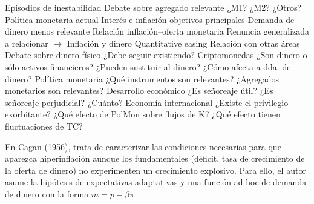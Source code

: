 \documentclass{nuevotema}
\begin{document}
\begin{esquemal}
				\4 Episodios de inestabilidad
				\4 Debate sobre agregado relevante
				\4[] ¿M1? ¿M2? ¿Otros?
			\3 Política monetaria actual
				\4 Interés e inflación objetivos principales
				\4 Demanda de dinero menos relevante
				\4 Relación inflación--oferta monetaria
				\4[] Renuncia generalizada a relacionar
				\4[] $\to$ Inflación y dinero
				\4[] Quantitative easing
			\3 Relación con otras áreas
				\4 Debate sobre dinero físico
				\4[] ¿Debe seguir existiendo?
				\4 Criptomonedas
				\4[] ¿Son dinero o sólo activos financieros?
				\4[] ¿Pueden sustituir al dinero?
				\4[] ¿Cómo afecta a dda. de dinero?
				\4 Política monetaria
				\4[] ¿Qué instrumentos son relevantes?
				\4[] ¿Agregados monetarios son relevantes?
				\4 Desarrollo económico
				\4[] ¿Es señoreaje útil?
				\4[] ¿Es señoreaje perjudicial?
				\4[] ¿Cuánto?
				\4 Economía internacional
				\4[] ¿Existe el privilegio exorbitante?
				\4[] ¿Qué efecto de PolMon sobre flujos de K?
				\4[] ¿Qué efecto tienen fluctuaciones de TC?
				\4[...]
\end{esquemal}





































\conceptos


En Cagan (1956), trata de caracterizar las condiciones necesarias para que aparezca hiperinflación aunque los fundamentales (déficit, tasa de crecimiento de la oferta de dinero) no experimenten un crecimiento explosivo. Para ello, el autor asume la hipótesis de expectativas adaptativas y una función ad-hoc de demanda de dinero con la forma $m = p - \beta \pi$

\end{document}
